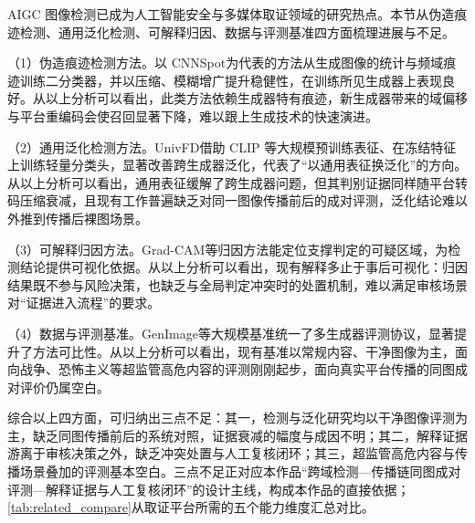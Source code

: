 \documentclass[UTF8, a4paper, 12pt]{ctexart}
\begin{document}
AIGC 图像检测已成为人工智能安全与多媒体取证领域的研究热点。本节从伪造痕迹检测、通用泛化检测、可解释归因、数据与评测基准四方面梳理进展与不足。

（1）伪造痕迹检测方法。以 CNNSpot\cite{wang2020cnn}为代表的方法从生成图像的统计与频域痕迹训练二分类器，并以压缩、模糊增广提升稳健性，在训练所见生成器上表现良好。从以上分析可以看出，此类方法依赖生成器特有痕迹，新生成器带来的域偏移与平台重编码会使召回显著下降，难以跟上生成技术的快速演进。

（2）通用泛化检测方法。UnivFD\cite{ojha2023towards}借助 CLIP 等大规模预训练表征、在冻结特征上训练轻量分类头，显著改善跨生成器泛化，代表了“以通用表征换泛化”的方向。从以上分析可以看出，通用表征缓解了跨生成器问题，但其判别证据同样随平台转码压缩衰减，且现有工作普遍缺乏对同一图像传播前后的成对评测，泛化结论难以外推到传播后裸图场景。

（3）可解释归因方法。Grad-CAM\cite{selvaraju2017gradcam}等归因方法能定位支撑判定的可疑区域，为检测结论提供可视化依据。从以上分析可以看出，现有解释多止于事后可视化：归因结果既不参与风险决策，也缺乏与全局判定冲突时的处置机制，难以满足审核场景对“证据进入流程”的要求。

（4）数据与评测基准。GenImage\cite{zhu2023genimage}等大规模基准统一了多生成器评测协议，显著提升了方法可比性。从以上分析可以看出，现有基准以常规内容、干净图像为主，面向战争、恐怖主义等超监管高危内容的评测刚刚起步\cite{mu2025exda}，面向真实平台传播的同图成对评价仍属空白。

综合以上四方面，可归纳出三点不足：其一，检测与泛化研究均以干净图像评测为主，缺乏同图传播前后的系统对照，证据衰减的幅度与成因不明；其二，解释证据游离于审核决策之外，缺乏冲突处置与人工复核闭环；其三，超监管高危内容与传播场景叠加的评测基本空白。三点不足正对应本作品“跨域检测—传播链同图成对评测—解释证据与人工复核闭环”的设计主线，构成本作品的直接依据；\cref{tab:related_compare}从取证平台所需的五个能力维度汇总对比。

\begin{table}[htbp]
  \centering
  \caption{代表性工作与本作品的能力对比（\checkmark~支持；$\triangle$~部分涉及；---~未涉及）}
  \label{tab:related_compare}
  \small
  \setlength{\tabcolsep}{4pt}
\end{table}
\end{document}
